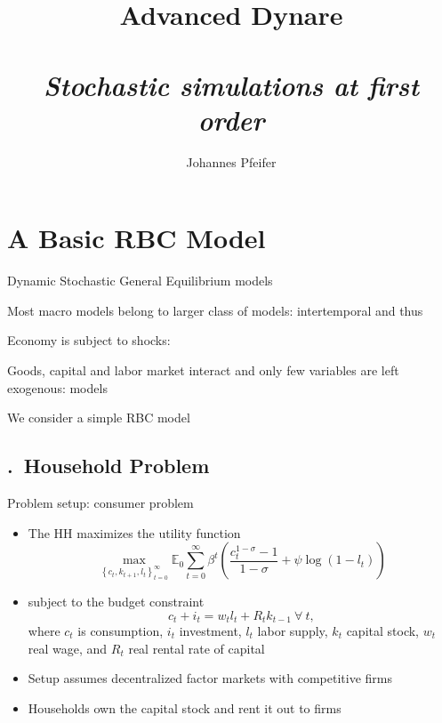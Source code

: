 \documentclass[handout,usepdftitle=false,xcolor=dvipsnames,aspectratio=169]{beamer}
\title[]{\textbf{Advanced Dynare\\}
\medskip{Chapter IV}\\
\emph{Stochastic simulations at first order}
}
\author{Johannes Pfeifer}
\begin{document}
\begin{frame}[plain]
  \titlepage
\end{frame}

\section{A Basic RBC Model}

\begin{frame}{Dynamic Stochastic General Equilibrium models}
\begin{witemize}
\item Most macro models belong to larger class of  models: intertemporal and thus 
\item Economy is subject to shocks: 
\item Goods, capital and labor market interact and only few variables are left exogenous:  models
\item We consider a simple RBC model
\end{witemize}
\end{frame}


\subsection{\thesection.\thesubsection \ Household Problem}

\begin{frame}{Problem setup: consumer problem}
\begin{itemize}
    \item The HH maximizes the utility function
        \begin{equation}
        \mathop {\max }\limits_{\left\{ {{c_t},{k_{t + 1}},{l_{t}}} \right\}_{t = 0}^\infty } { \mathbb{E}_0}\sum\limits_{t = 0}^\infty  {{\beta ^t}\left( \frac{c_t^{1 - \sigma }-1}{{1 - \sigma }} + \psi \log(1-l_t)\right)}
        \end{equation}
    \item subject to the budget constraint
        \begin{equation}
            c_t + i_t= w_t l_t  + R_t k_{t-1} \: \forall \: t ,
        \end{equation}
    where $c_t$ is consumption, $i_t$ investment, $l_t$ labor supply, $k_t$ capital stock,  $w_t$ real wage, and $R_t$ real rental rate of capital
    \item Setup assumes decentralized factor markets with competitive firms 
    \item Households own the capital stock and rent it out to firms
\end{itemize}
\end{frame}
\end{document}
